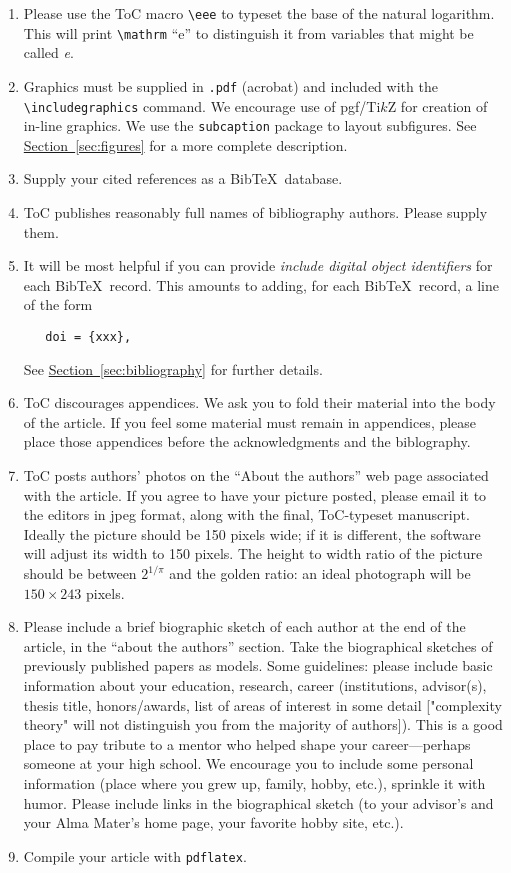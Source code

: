 \documentclass{article}
\theoremstyle{plain}
\newcommand{\expref}[2]{\texorpdfstring{\hyperref[#2]{#1~\ref{#2}}}{#1~\ref{#2}}}
\theoremstyle{definition}
\begin{document}
\begin{enumerate}
\item  Please use the ToC macro 
\lstinline.\eee. to typeset the base of the natural logarithm.
This will print \lstinline.\mathrm.  ``$\mathrm{e}$''
to distinguish it from variables that might be called \emph{e}.
\item Graphics must be supplied in \lstinline`.pdf` (acrobat) and included
with the \lstinline`\includegraphics` command. We encourage use of
pgf/Ti$k$Z for creation of in-line graphics. We use the
\lstinline.subcaption. package to layout subfigures. See
\expref{Section}{sec:figures} for a more complete description.
\item Supply your cited references as a Bib\TeX\ database.
\item ToC publishes reasonably full names of bibliography
  authors.  Please supply them.
\item It will be most helpful if you can provide
    \emph{include digital
    object identifiers} for each Bib\TeX\ record. This
    amounts to adding, for each Bib\TeX\ record, a line of the form
\begin{lstlisting}
   doi = {xxx},
\end{lstlisting}
  See \expref{Section}{sec:bibliography} for further details.
\item ToC discourages appendices.  We ask you to fold their
material into the body of the article. If you feel some
material must remain in appendices, please place those appendices
before the acknowledgments and the biblography.
\item ToC posts authors' photos on the ``About the authors'' web page
associated with the article. If you agree to have your picture posted,
please email it to the editors in jpeg format, along with the final,
ToC-typeset manuscript. Ideally the picture
should be 150 pixels wide; if it is different, the software will
adjust its width to 150 pixels. The height to width ratio of the
picture should be between $2^{1/\pi}$ and the golden ratio: an ideal
photograph will be $150 \times 243$ pixels.
\item Please include a brief biographic sketch of each author at the
end of the article, in the ``about the authors'' section. Take the
biographical
sketches of previously published papers as models. Some guidelines:
please include basic information about your education, research,
career (institutions, advisor(s), thesis title, honors/awards, list of
areas of interest in some detail ["complexity theory" will not
distinguish you from the majority of authors]). This is a good place
to pay tribute to a mentor who helped shape your career---perhaps
someone at your high school. We encourage you to include some personal
information (place where you grew up, family, hobby, etc.), sprinkle
it with humor. Please include links in the biographical sketch (to
your advisor's and your Alma Mater's home page, your favorite hobby
site, etc.).
\item Compile your article with \lstinline`pdflatex`.
\end{enumerate}
\end{document}

